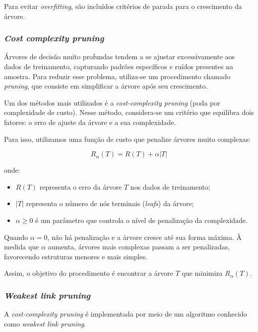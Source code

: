 \documentclass{article}
\begin{document}
Para evitar \textit{overfitting}, são incluídos critérios de parada para o
crescimento da árvore.

\subsubsection{\textit{Cost complexity pruning}}

Árvores de decisão muito profundas tendem a se ajustar excessivamente aos
dados de treinamento, capturando padrões específicos e ruídos presentes na
amostra. Para reduzir esse problema, utiliza-se um procedimento chamado \textit{pruning},
que consiste em simplificar a árvore após seu crescimento.

Um dos métodos mais utilizados é a \textit{cost-complexity pruning}
(poda por complexidade de custo). Nesse método, considera-se um critério
que equilibra dois fatores: o erro de ajuste da árvore e a sua complexidade.

Para isso, utilizamos uma função de custo que penalize árvores muito complexas:

\begin{equation}
    R_{\alpha}(T) = R(T) + \alpha |T|
\end{equation}

onde:

\begin{itemize}
    \item $R(T)$ representa o erro da árvore $T$ nos dados de treinamento;
    \item $|T|$ representa o número de nós terminais (\textit{leafs}) da árvore;
    \item $\alpha \ge 0$ é um parâmetro que controla o nível de penalização
    da complexidade.
\end{itemize}

Quando $\alpha = 0$, não há penalização e a árvore cresce até sua forma máxima. 
À medida que $\alpha$ aumenta, árvores mais complexas passam a ser penalizadas, 
favorecendo estruturas menores e mais simples.

Assim, o objetivo do procedimento é encontrar a árvore $T$ que minimiza
$R_{\alpha}(T)$.

\subsubsection{\textit{Weakest link pruning}}

A \textit{cost-complexity pruning} é implementada por meio de um algoritmo 
conhecido como \textit{weakest link pruning}.
\end{document}
